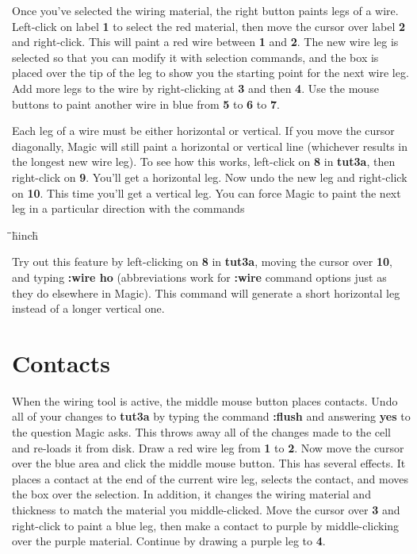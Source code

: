 \documentclass[letterpaper,twoside,12pt]{article}
\def\hinch{\hspace*{0.5in}}
\def\starti{\begin{center}\begin{tabbing}\hinch\=\hinch\=\hinch\=hinch\hinch\=\kill}
\def\endi{\end{tabbing}\end{center}}
\def\ii{\>\>\>}
\begin{document}
Once you've selected the wiring material, the right
button paints legs of a wire.  Left-click on label {\bfseries 1} to
select the red material, then move the cursor over label
{\bfseries 2} and right-click.  This will paint a red wire between
{\bfseries 1} and {\bfseries 2}.  The new wire leg is selected so that you
can modify it with selection commands, and the box is placed
over the tip of the leg to show you the starting point for the
next wire leg.  Add more legs to the wire by right-clicking
at {\bfseries 3} and then {\bfseries 4}.  Use the mouse buttons to paint
another wire in blue from {\bfseries 5} to {\bfseries 6} to {\bfseries 7}.

Each leg of a wire must be either horizontal or vertical.  If you
move the cursor diagonally, Magic will still paint a horizontal
or vertical line (whichever results in the longest new wire leg).
To see how this works, left-click on {\bfseries 8} in {\bfseries tut3a},
then right-click on {\bfseries 9}.  You'll get a horizontal leg.  Now
undo the new leg and right-click on {\bfseries 10}.  This time you'll
get a vertical leg.  You can force Magic to paint the next
leg in a particular direction with the commands

\starti
   \ii {\bfseries :wire horizontal} \\
   \ii {\bfseries :wire vertical}
\endi

Try out this feature by left-clicking on {\bfseries 8} in {\bfseries tut3a},
moving the cursor over {\bfseries 10}, and typing {\bfseries :wire ho}
(abbreviations work for {\bfseries :wire} command options just as
they do elsewhere in Magic).  This command will generate a
short horizontal leg instead of a longer vertical one.

\section{Contacts}

When the wiring tool is active, the middle mouse button places
contacts.  Undo all of your changes to {\bfseries tut3a} by typing
the command {\bfseries :flush} and answering {\bfseries yes} to the
question Magic asks.  This throws away all of the changes made to the
cell and re-loads it from disk.  Draw a red wire leg from
{\bfseries 1} to {\bfseries 2}.  Now move the cursor over the blue area and
click the middle mouse button.  This has several effects.  It
places a contact at the end of the current wire leg, selects the
contact, and moves the box over the selection.  In addition, it changes
the wiring material and thickness to match the material you
middle-clicked.  Move the cursor over {\bfseries 3} and right-click
to paint a blue leg, then make a contact to purple by middle-clicking
over the purple material.  Continue by drawing a purple leg to {\bfseries 4}.
\end{document}
